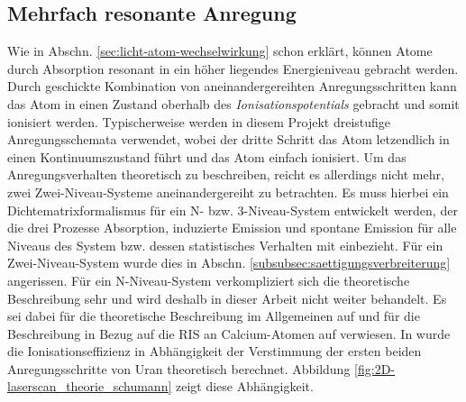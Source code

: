\subsection{Mehrfach
resonante Anregung}\label{subsec:mehrfach_resonante_anregung}
Wie in Abschn. \ref{sec:licht-atom-wechselwirkung} schon erklärt, können Atome
durch Absorption resonant in ein höher liegendes Energieniveau gebracht werden.
Durch geschickte Kombination von aneinandergereihten Anregungsschritten kann
das Atom in einen Zustand oberhalb des \textit{Ionisationspotentials} gebracht
und somit ionisiert werden. Typischerweise werden in diesem Projekt dreistufige
Anregungsschemata verwendet, wobei der dritte Schritt das Atom letzendlich in
einen Kontinuumszustand führt und das Atom einfach ionisiert. Um das
Anregungsverhalten theoretisch zu beschreiben, reicht es allerdings nicht mehr,
zwei Zwei-Niveau-Systeme aneinandergereiht zu betrachten. Es muss hierbei ein
Dichtematrixformalismus für ein N- bzw. 3-Niveau-System entwickelt werden, der
die drei Prozesse Absorption, induzierte Emission und spontane Emission für alle
Niveaus des System bzw. dessen statistisches Verhalten mit einbezieht. Für ein
Zwei-Niveau-System wurde dies in Abschn. 
\ref{subsubsec:saettigungsverbreiterung} angerissen. Für ein N-Niveau-System
verkompliziert sich die theoretische Beschreibung sehr und wird deshalb in
dieser Arbeit nicht weiter behandelt. Es sei dabei für die theoretische
Beschreibung im Allgemeinen auf \cite{blum:density_matrix_theory} und für die
Beschreibung in Bezug auf die RIS an Calcium-Atomen auf
\cite{noertershaeuser:1999:dissertation} verwiesen. In
\cite{schumann:2005:dissertation} wurde die Ionisationseffizienz in Abhängigkeit
der Verstimmung der ersten beiden Anregungsschritte von Uran theoretisch
berechnet. Abbildung \ref{fig:2D-laserscan_theorie_schumann} zeigt diese
Abhängigkeit.
